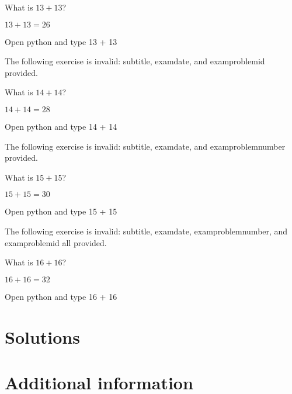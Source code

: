 \documentclass[oneside]{book}
\begin{document}
\begin{exercise}[subtitle={Simple Addition}, examproblemnumber={13}, examproblemid={2020-01-15-13}]
  What is \(13 + 13\)?
\end{exercise}
\begin{solution}
  \(13 + 13 = 26\)
\end{solution}
\begin{additionalinformation}
Open python and type 13 + 13
\end{additionalinformation}

The following exercise is invalid: subtitle, examdate, and examproblemid provided.

\begin{exercise}[subtitle={Simple Addition}, examdate={January 15, 2020}, examproblemid={2020-01-15-14}]
  What is \(14 + 14\)?
\end{exercise}
\begin{solution}
  \(14 + 14 = 28\)
\end{solution}
\begin{additionalinformation}
Open python and type 14 + 14
\end{additionalinformation}

The following exercise is invalid: subtitle, examdate, and examproblemnumber provided.

\begin{exercise}[subtitle={Simple Addition}, examdate={January 15, 2020}, examproblemnumber={15}]
  What is \(15 + 15\)?
\end{exercise}
\begin{solution}
  \(15 + 15 = 30\)
\end{solution}
\begin{additionalinformation}
Open python and type 15 + 15
\end{additionalinformation}

The following exercise is invalid: subtitle, examdate, examproblemnumber, and examproblemid all provided.

\begin{exercise}[subtitle={Simple Addition}, examdate={January 15, 2020}, examproblemnumber={16}, examproblemid={2020-01-15-16}]
  What is \(16 + 16\)?
\end{exercise}
\begin{solution}
  \(16 + 16 = 32\)
\end{solution}
\begin{additionalinformation}
Open python and type 16 + 16
\end{additionalinformation}

\chapter{Solutions}

\chapter{Additional information}
\end{document}

